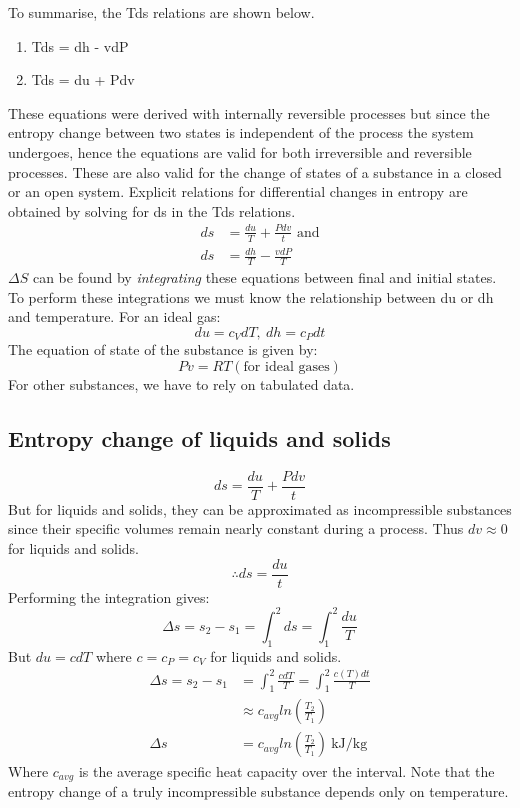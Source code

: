 \documentclass[class=report, crop=false, 12pt,a4paper]{standalone}
\numberwithin{equation}{section}
\begin{document}
To summarise, the Tds relations are shown below.
\begin{enumerate}[noitemsep]
  \item Tds = dh - vdP
  \item Tds = du + Pdv
\end{enumerate}
These equations were derived with internally reversible processes but since the entropy change between two states is independent of the process the system undergoes, hence the equations are valid for both irreversible and reversible processes. These are also valid for the change of states of a substance in a closed or an open system. Explicit relations for differential changes in entropy are obtained by solving for ds in the Tds relations.
\begin{align}
  ds &= \frac{du}{T} + \frac{Pdv}{t} \textrm{ and}\\
  ds &= \frac{dh}{T} - \frac{vdP}{T}
\end{align}
\(\Delta S\) can be found by \emph{integrating} these equations between final and initial states. To perform these integrations we must know the relationship between du or dh and temperature. For an ideal gas:
\begin{equation} 
  du = c_V dT, \ dh = c_P dt 
\end{equation}
The equation of state of the substance is given by:
\begin{equation} 
  Pv = RT (\textrm{for ideal gases}) 
\end{equation}
For other substances, we have to rely on tabulated data.
\subsection{Entropy change of liquids and solids}
\begin{equation} 
  ds = \frac{du}{T} + \frac{Pdv}{t} 
\end{equation}
But for liquids and solids, they can be approximated as incompressible substances since their specific volumes remain nearly constant during a process. Thus \(dv \approx 0 \) for liquids and solids.
\begin{equation} 
  \therefore ds = \frac{du}{t}
\end{equation}
Performing the integration gives:
\begin{equation} 
  \Delta s = s_2 - s_1 = \int_1^2 ds = \int_1^2 \frac{du}{T} 
\end{equation}
But \(du = cdT\) where \( c = c_P = c_V\) for liquids and solids.
\begin{align}
  \Delta s = s_2 - s_1 &= \int_1^2 \frac{cdT}{T} = \int_1^2 \frac{c(T)dt}{T}\\
  &\approx c_{avg} ln(\frac{T_2}{T_1})\\
  \Delta s &= c_{avg} ln(\frac{T_2}{T_1}) \ \si{\kilo\joule\per\kg}
\end{align}
Where \(c_{avg}\) is the average specific heat capacity over the interval. Note that the entropy change of a truly incompressible substance depends only on temperature.
\end{document}
